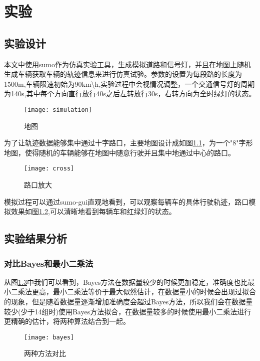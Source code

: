 \chapter{实验}
\label{chap4}

\section{实验设计}

本文中使用sumo作为仿真实验工具，生成模拟道路和信号灯，并且在地图上随机生成车辆获取车辆的轨迹信息来进行仿真试验。参数的设置为每段路的长度为1500m,车辆限速初始为90km\textbackslash h,实验过程中会视情况调整，一个交通信号灯的周期为140s,其中每个方向直行放行40s之后左转放行30s，右转方向为全时绿灯的状态。

\begin{figure}[H] 
  \centering
  \texttt{[image: simulation]}
  \caption{地图}
  \label{fig:4.1}
\end{figure}

为了让轨迹数据能够集中通过十字路口，主要地图设计成如图\ref{fig:4.1}，为一个"8"字形地图，使得随机的车辆能够在地图中随意行驶并且集中地通过中心的路口。

\begin{figure}[H] 
  \centering
  \texttt{[image: cross]}
  \caption{路口放大}
  \label{fig:4.2}
\end{figure}

模拟过程可以通过sumo-gui直观地看到，可以观察每辆车的具体行驶轨迹，路口模拟效果如图\ref{fig:4.2},可以清晰地看到每辆车和红绿灯的状态。

\section{实验结果分析}

\subsection{对比Bayes和最小二乘法}
从图\ref{fig:4.8}中我们可以看到，Bayes方法在数据量较少的时候更加稳定，准确度也比最小二乘法更高，最小二乘法等价于最大似然估计，在数据量小的时候会出现过拟合的现象，但是随着数据量逐渐增加准确度会超过Bayes方法，所以我们会在数据量较少(少于14组时)使用Bayes方法拟合，在数据量较多的时候使用最小二乘法进行更精确的估计，将两种算法结合到一起。

\begin{figure}[H] 
  \centering
  \texttt{[image: bayes]}
  \caption{两种方法对比}
  \label{fig:4.8}
\end{figure}

